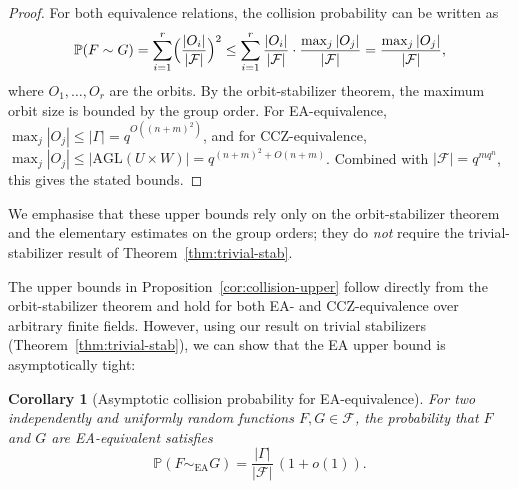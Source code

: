 \documentclass[11pt]{article}
\newtheorem{corollary}[theorem]{Corollary}
\theoremstyle{definition}
\newcommand{\Fcal}{\mathcal{F}}
\newcommand{\Gam}{\Gamma}
\newcommand{\AGL}{\mathrm{AGL}}
\renewcommand{\Pr}{\mathbb{P}}
\begin{document}
\begin{proof}
For both equivalence relations, the collision probability can be written as
\[
\Pr(F \sim G)
= \sum_{i=1}^r \Bigl( \frac{|O_i|}{|\Fcal|} \Bigr)^2
\le \sum_{i=1}^r \frac{|O_i|}{|\Fcal|} \cdot \frac{\max_j |O_j|}{|\Fcal|}
= \frac{\max_j |O_j|}{|\Fcal|},
\]
where $O_1,\dots,O_r$ are the orbits. By the orbit-stabilizer theorem, the maximum
orbit size is bounded by the group order. For EA-equivalence,
$\max_j |O_j| \le |\Gam|=q^{O((n+m)^2)}$, and for CCZ-equivalence,
$\max_j |O_j| \le |\AGL(U \times W)|=q^{(n+m)^2+O(n+m)}$. Combined with
$|\Fcal| = q^{mq^n}$, this gives the stated bounds.
\end{proof}

We emphasise that these upper bounds rely only on the orbit-stabilizer theorem and
the elementary estimates on the group orders; they do \emph{not} require the
trivial-stabilizer result of Theorem~\ref{thm:trivial-stab}.


The upper bounds in Proposition~\ref{cor:collision-upper} follow directly from the
orbit-stabilizer theorem and hold for both EA- and CCZ-equivalence over arbitrary finite
fields. However, using our result on trivial stabilizers (Theorem~\ref{thm:trivial-stab}),
we can show that the EA upper bound is asymptotically tight:

\begin{corollary}[Asymptotic collision probability for EA-equivalence]\label{cor:collision-ea-asymptotic}
For two independently and uniformly random functions $F,G\in\Fcal$,
the probability that $F$ and $G$ are EA-equivalent satisfies
\[
\Pr(F\sim_{\mathrm{EA}} G)
= \frac{|\Gam|}{|\Fcal|}\,(1+o(1)).
\]
\end{corollary}
\end{document}
